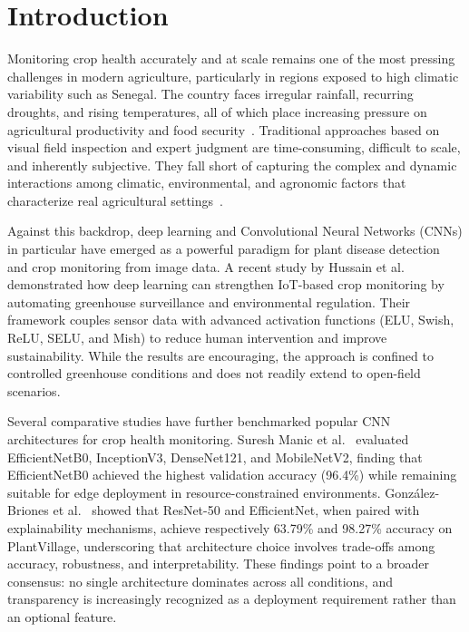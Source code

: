 \documentclass[pdflatex,sn-basic]{sn-jnl}
\begin{document}

\maketitle

\section{Introduction}
\label{sec:intro}

Monitoring crop health accurately and at scale remains one of the most pressing challenges in modern agriculture, particularly in regions exposed to high climatic variability such as Senegal. The country faces irregular rainfall, recurring droughts, and rising temperatures, all of which place increasing pressure on agricultural productivity and food security~\cite{koseki_dakar_2024}. Traditional approaches based on visual field inspection and expert judgment are time-consuming, difficult to scale, and inherently subjective. They fall short of capturing the complex and dynamic interactions among climatic, environmental, and agronomic factors that characterize real agricultural settings~\cite{misbah_multi-sensors_2021}.

Against this backdrop, deep learning and Convolutional Neural Networks (CNNs) in particular have emerged as a powerful paradigm for plant disease detection and crop monitoring from image data. A recent study by Hussain et al.~\cite{mir_deep_2025} demonstrated how deep learning can strengthen IoT-based crop monitoring by automating greenhouse surveillance and environmental regulation. Their framework couples sensor data with advanced activation functions (ELU, Swish, ReLU, SELU, and Mish) to reduce human intervention and improve sustainability. While the results are encouraging, the approach is confined to controlled greenhouse conditions and does not readily extend to open-field scenarios.

Several comparative studies have further benchmarked popular CNN architectures for crop health monitoring. Suresh Manic et al.~\cite{SureshManic2025} evaluated EfficientNetB0, InceptionV3, DenseNet121, and MobileNetV2, finding that EfficientNetB0 achieved the highest validation accuracy (96.4\%) while remaining suitable for edge deployment in resource-constrained environments. González-Briones et al.~\cite{GonzalezBriones2025} showed that ResNet-50 and EfficientNet, when paired with explainability mechanisms, achieve respectively 63.79\% and 98.27\% accuracy on PlantVillage, underscoring that architecture choice involves trade-offs among accuracy, robustness, and interpretability. These findings point to a broader consensus: no single architecture dominates across all conditions, and transparency is increasingly recognized as a deployment requirement rather than an optional feature.
\end{document}
